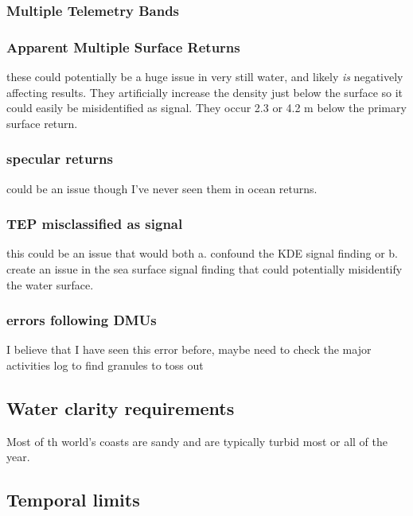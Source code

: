 \subsubsection{Multiple Telemetry Bands}


\subsubsection{Apparent Multiple Surface Returns}

these could potentially be a huge issue in very still water, and likely \emph{is} negatively affecting results. They artificially increase the density just below the surface so it could easily be misidentified as signal. They occur 2.3 or 4.2 m below the primary surface return.

\subsubsection{specular returns}

could be an issue though I've never seen them in ocean returns. 

\subsubsection{TEP misclassified as signal}

this could be an issue that would both a. confound the KDE signal finding or b. create an issue in the sea surface signal finding that could potentially misidentify the water surface.

\subsubsection{errors following DMUs}

I believe that I have seen this error before, maybe need to check the major activities log to find granules to toss out

\subsection{Water clarity requirements}

Most of th world's coasts are sandy and are typically turbid most or all of the year.

\subsection{Temporal limits}

